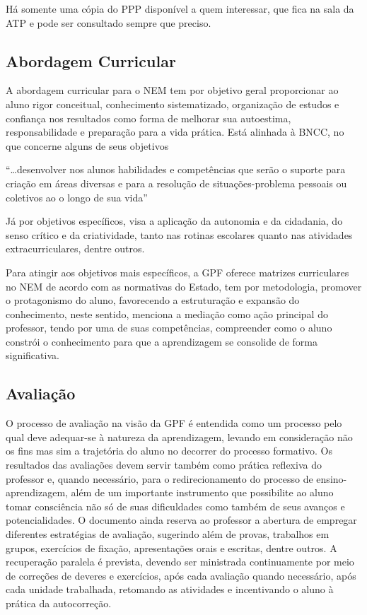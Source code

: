 Há somente uma cópia do \ac{PPP} disponível a quem interessar, que fica na sala da \ac{ATP} e pode ser consultado sempre que preciso.

\subsection{Abordagem Curricular}
A abordagem curricular para o \ac{NEM} tem por objetivo geral proporcionar ao aluno rigor conceitual, conhecimento sistematizado, organização de estudos e confiança nos resultados como forma de melhorar sua autoestima, responsabilidade e preparação para a vida prática. Está alinhada à BNCC, no que concerne alguns de seus objetivos

\begin{citacao}
    ``\ldots desenvolver nos alunos habilidades e competências que serão o suporte para criação em áreas diversas e para a resolução de situações-problema pessoais ou coletivos ao o longo de sua vida'' \cite[p. ~32]{GPFPPP:2021}
\end{citacao}
Já por objetivos específicos, visa a aplicação da autonomia e da cidadania, do senso crítico e da criatividade, tanto nas rotinas escolares quanto nas atividades extracurriculares, dentre outros.

Para atingir aos objetivos mais específicos, a \ac{GPF} oferece matrizes curriculares no \ac{NEM} de acordo com as normativas do Estado, tem por metodologia, promover o protagonismo do aluno, favorecendo a estruturação e expansão do conhecimento, neste sentido, menciona a mediação como ação principal do professor, tendo por uma de suas competências, compreender como o aluno constrói o conhecimento para que a aprendizagem se consolide de forma significativa. 

\subsection{Avaliação}
O processo de avaliação na visão da \ac{GPF} é entendida como um processo pelo qual deve adequar-se à natureza da aprendizagem, levando em consideração não os fins mas sim a trajetória do aluno no decorrer do processo formativo. Os resultados das avaliações devem servir também como prática reflexiva do professor e, quando necessário, para o redirecionamento do processo de ensino-aprendizagem, além de um importante instrumento que possibilite ao aluno tomar consciência não só de suas dificuldades como também de seus avanços e potencialidades. O documento ainda reserva ao professor a abertura de empregar diferentes estratégias de avaliação, sugerindo além de provas, trabalhos em grupos, exercícios de fixação, apresentações orais e escritas, dentre outros. A recuperação paralela é prevista, devendo ser ministrada continuamente por meio de correções de deveres e exercícios, após cada avaliação quando necessário, após cada unidade trabalhada, retomando as atividades e incentivando o aluno à prática da autocorreção. 

